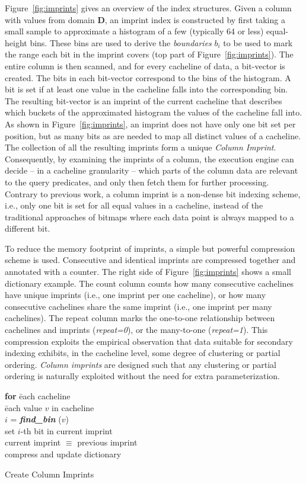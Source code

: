 \documentclass[sigconf]{acmart}
\begin{document}
Figure~\ref{fig:imprints} gives an overview of the index structures. Given a column with values from
domain $\mathbf{D}$, an imprint index is constructed by first taking a small
sample to approximate a histogram of a few (typically 64 or less) equal-height
bins. These bins are used to derive the {\em boundaries} $b_i$ to be used to mark the range
each bit in the imprint covers (top part of Figure~\ref{fig:imprints}).  The entire column is
then scanned, and for every cacheline of data, a bit-vector is created. The 
bits in each bit-vector correspond to the bins of the histogram. A bit is set if at least one value in 
the cacheline falls into the corresponding bin. The resulting bit-vector is an imprint of the
current cacheline that describes which buckets of the approximated
histogram the values of the cacheline fall into. As shown in Figure~\ref{fig:imprints}, an imprint does
not have only one bit set per position, but as many bits as are needed
to map all distinct values of a cacheline. The collection of
all the resulting imprints form a unique {\em Column Imprint}. Consequently,
by examining the imprints of a column, the execution engine 
can decide -- in a cacheline granularity -- which parts of the column
data are relevant to the query predicates, and only then fetch them
for further processing. Contrary to previous work, a column imprint is a
non-dense bit indexing scheme, i.e., only one bit is set for all equal values
in a cacheline, instead of the traditional approaches of bitmaps where each
data point is always mapped to a different bit.

To reduce the memory footprint of imprints, a simple but powerful compression scheme is used.
Consecutive and identical imprints are compressed together and annotated with a counter.
The right side of Figure~\ref{fig:imprints} shows a small dictionary example. The count
column counts how many consecutive cachelines have unique imprints
(i.e., one imprint per one cacheline), or how many consecutive cachelines share the same imprint
(i.e., one imprint per many cachelines). The repeat column marks
the one-to-one relationship between cachelines and imprints ({\em repeat=0}), or the many-to-one
({\em repeat=1}). This compression exploits
the empirical observation that data suitable for secondary indexing
exhibits, in the cacheline level, some degree of clustering or partial
ordering. {\em Column imprints} are designed such that any clustering or partial
ordering is naturally exploited without the need for extra parameterization. 

\begin{algorithm}[t]
\begin{tabbing}
{\bf for} \=each cacheline\\
    \=each value $v$ in cacheline\\
        \>\>$i$ = \textbf{\textit{find\_bin}} ($v$)\\
        \>\>set $i$-th bit in current imprint\\
     current imprint $\equiv$ previous imprint\\
     \>\> compress and update dictionary
\end{tabbing}        
\caption{Create Column Imprints\label{algo:create}}
\end{algorithm}
\end{document}
